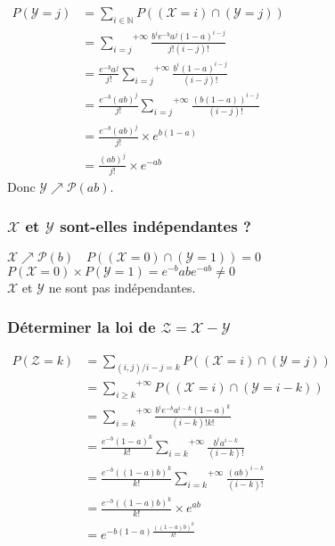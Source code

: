 \documentclass[a4paper, 12pt]{article}
\begin{document}
$
\begin{aligned}
P(\mathcal{Y} = j) &= \underset{i \in \mathbb{N}}{\sum} P((\mathcal{X} = i) \cap (\mathcal{Y} = j)) \\
&= \overset{+\infty}{\underset{i = j}{\sum}} \frac{b^i e^{-b} a^j (1 - a)^{i - j}}{j! (i - j)!} \\
&= \frac{e^{-b} a^j}{j!} \overset{+\infty}{\underset{i = j}{\sum}} \frac{b^i (1 - a)^{i - j}}{(i - j)!} \\
&= \frac{e^{-b} (ab)^j}{j!} \overset{+\infty}{\underset{i = j}{\sum}} \frac{(b(1 - a))^{i - j}}{(i - j)!} \\
&= \frac{e ^{-b} (ab)^j}{j!} \times e^{b (1 - a)} \\
&\boxed{= \frac{(ab)^j}{j!} \times e^{-ab} }
\end{aligned}
$\\

Donc $\mathcal{Y} \nearrow \mathcal{P} (ab)$. 


\subsubsection{$\mathcal{X}$ et $\mathcal{Y}$ sont-elles indépendantes ?}
\begin{flushleft}
$\mathcal{X} \nearrow \mathcal{P} (b) \quad P((\mathcal{X} = 0) \cap (\mathcal{Y} = 1)) = 0$ \\
$P(\mathcal{X} = 0) \times P(\mathcal{Y} = 1) = e^{-b} ab e^{-ab} \neq 0$ \\
$\mathcal{X}$ et $\mathcal{Y}$ ne sont pas indépendantes.
\end{flushleft}


\subsubsection{Déterminer la loi de $\mathcal{Z} = \mathcal{X} - \mathcal{Y}$}
$
\begin{aligned}
P(\mathcal{Z} = k) &= \underset{(i, j) / i - j = k}{\sum} P((\mathcal{X} = i) \cap (\mathcal{Y} = j)) \\
&= \overset{+\infty}{\underset{i \geq k}{\sum}} P((\mathcal{X} = i) \cap (\mathcal{Y} = i - k)) \\
&= \overset{+\infty}{\underset{i = k}{\sum}} \frac{b^i e^{-b} a^{i - k} (1 - a)^k}{(i - k)! k!} \\
&= \frac{e^{-b} (1 - a)^k}{k!} \overset{+\infty}{\underset{i = k}{\sum}} \frac{b^i a^{i - k}}{(i - k)!} \\
&= \frac{e^{-b} ((1 - a)b)^k}{k!} \overset{+\infty}{\underset{i = k}{\sum}} \frac{(ab)^{i - k}}{(i - k)!} \\
&= \frac{e^{-b} ((1 - a)b)^k}{k!} \times e^{ab} \\
&= e^{-b (1 - a) \frac{((1 - a)b)^k}{k!}}
\end{aligned}
$
\end{document}
